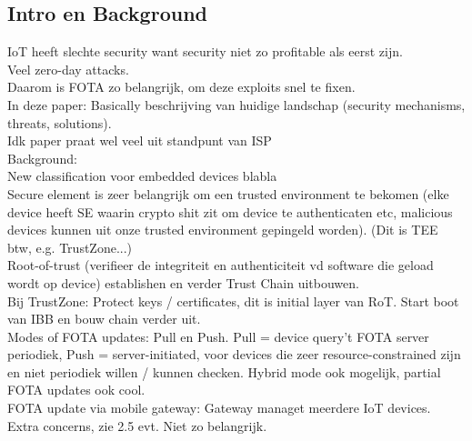 \subsection{Intro en Background}
IoT heeft slechte security want security niet zo profitable als eerst zijn.\\
Veel zero-day attacks.\\
Daarom is FOTA zo belangrijk, om deze exploits snel te fixen.\\
In deze paper: Basically beschrijving van huidige landschap (security mechanisms, threats, solutions).\\
Idk paper praat wel veel uit standpunt van ISP
\\
Background:\\
New classification voor embedded devices blabla\\
Secure element is zeer belangrijk om een trusted environment te bekomen (elke device heeft SE waarin crypto shit zit om device te authenticaten etc, malicious devices kunnen uit onze trusted environment gepingeld worden). (Dit is TEE btw, e.g. TrustZone...)\\
Root-of-trust (verifieer de integriteit en authenticiteit vd software die geload wordt op device) establishen en verder Trust Chain uitbouwen.\\
Bij TrustZone: Protect keys / certificates, dit is initial layer van RoT. Start boot van IBB en bouw chain verder uit. \\
Modes of FOTA updates: Pull en Push. Pull = device query't FOTA server periodiek, Push = server-initiated, voor devices die zeer resource-constrained zijn en niet periodiek willen / kunnen checken. Hybrid mode ook mogelijk, partial FOTA updates ook cool.\\ 
FOTA update via mobile gateway: Gateway managet meerdere IoT devices. Extra concerns, zie 2.5 evt. Niet zo belangrijk.\\
